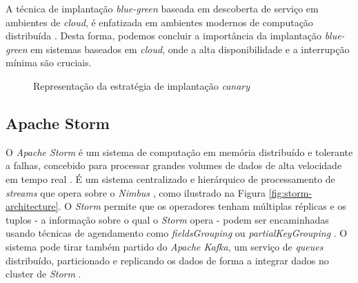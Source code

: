 A técnica de implantação \textit{blue-green} baseada em descoberta de serviço em ambientes de 
\textit{cloud}, é enfatizada em ambientes modernos de computação distribuída \cite{bluegreen}. 
Desta forma, podemos concluir a importância da implantação \textit{blue-green} em sistemas baseados 
em \textit{cloud}, onde a alta disponibilidade e a interrupção mínima são cruciais.

\begin{figure}[H]
    \centering
    \qquad
    \caption{Representação da estratégia de implantação \textit{canary}}%
    \label{fig:blue-green}%
\end{figure}

\subsection{Apache Storm}
\label{sec:storm}

O \textit{Apache Storm} é um sistema de computação em memória distribuído e tolerante a falhas, 
concebido para processar grandes volumes de dados de alta velocidade em tempo real \cite{storm2017}. 
É um sistema centralizado e hierárquico de processamento de \textit{streams} que opera sobre o 
\textit{Nimbus} \cite{storm2015}, como ilustrado na Figura \ref{fig:storm-architecture}. O 
\textit{Storm} permite que os operadores tenham múltiplas réplicas e os tuplos - a informação 
sobre o qual o \textit{Storm} opera - podem ser encaminhadas usando técnicas de agendamento como 
\textit{fieldsGrouping} ou \textit{partialKeyGrouping} \cite{storm2018}. O sistema pode tirar 
também partido do \textit{Apache Kafka}, um serviço de \textit{queues} distribuído, particionado e 
replicando os dados de forma a integrar dados no \gls{cluster} de \textit{Storm} \cite{storm2018b}.

